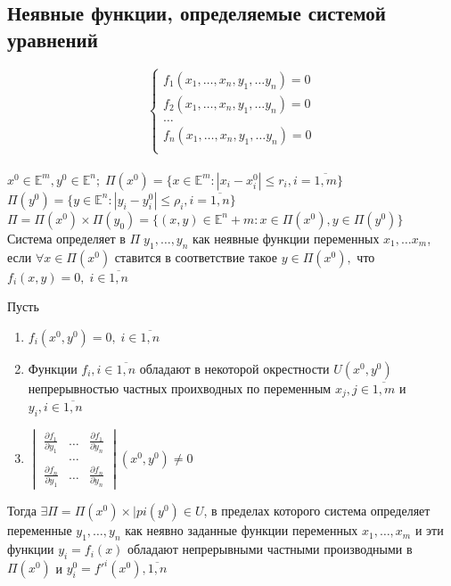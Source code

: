 \subsection{Неявные функции, определяемые системой уравнений}
$$\left\{
\begin{aligned}\label{al:1}
f_1(x_1, \dots, x_n, y_1, \dots y_n )=0\\
f_2(x_1, \dots, x_n, y_1, \dots y_n )=0\\
\dots \\
f_n(x_1, \dots, x_n, y_1, \dots y_n )=0\\
\end{aligned}
\right.
$$\\
$x^0\in\mathbb{E}^m, y^0 \in \mathbb{E}^n; \; 
 \Pi(x^0)=\{x\in \mathbb{E}^m: |x_i-x_i^0|\leq r_i, i=\overline{1,m}\}$ \\
$\Pi(y^0)=\{y\in \mathbb{E}^n: |y_i-y_i^0|\leq \rho_i, i=\overline{1,n}\}$ \\
$\Pi=\Pi(x^0)\times \Pi(y_0)=\{(x,y)\in \mathbb{E}^n+m: x\in\Pi(x^0), y\in \Pi(y^0)\}$\\
Система  определяет в $\Pi\; y_1,\dots,y_n$ как неявные функции переменных $x_1, \dots x_m$, если $\forall x \in \Pi(x^0)$ ставится в соответствие такое $y\in \Pi(x^0),$ что $f_i(x,y)=0, \; i\in\overline{1,n}$ 
\begin{theorem}
	Пусть 
	\begin{enumerate}
		\item $f_i(x^0,y^0)=0, \;i\in\overline{1,n}$
		\item Функции $f_i, i\in\overline{1,n}$ обладают в некоторой окрестности $U(x^0,y^0) $ непрерывностью частных проихводных по переменным $x_j, j\in\overline{1,m}$ и $y_i, i\in\overline{1,n}$ 
		\item 
		$\begin{vmatrix}
			\frac{\partial f_1}{\partial y_1} & \dots & \frac{\partial f_1}{\partial y_n}	 \\
			 & \dots & 	 \\
			\frac{\partial f_n}{\partial y_1}& \dots & \frac{\partial f_n}{\partial y_n}
		\end{vmatrix}(x^0,y^0)\ne 0$
	\end{enumerate}
	Тогда $\exists \Pi=\Pi(x^0)\times |pi(y^0) \in U$, в пределах которого система определяет переменные $y_1,\dots,y_n$ как неявно заданные функции переменных $x_1,\dots,x_m$ и эти функции $y_i=f_i(x)$ обладают непрерывными частными производными в $\Pi(x^0)$ и $y^0_i=f'^i(x^0), \overline{1,n}$
\end{theorem}



